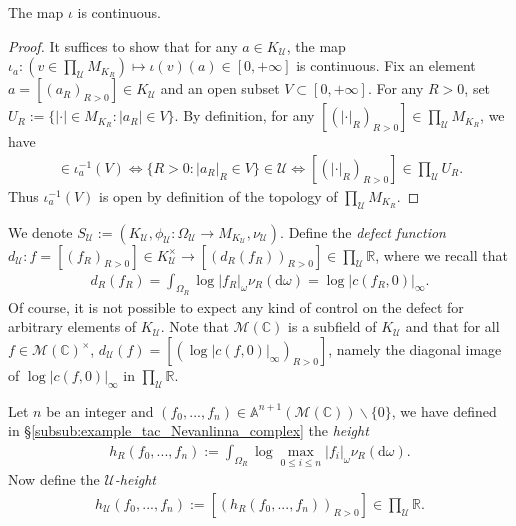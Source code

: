 \documentclass [11pt,reqno]{amsart}
\def\bC{{\mathbb{C}}}
\def\bR{{\mathbb{R}}}
\newcommand{\1}{\mathmybb{1}}
\def\cM{{\mathcal{M}}}
\def\cU{{\mathcal{U}}}
\def\diff{\mathrm{d}}
\def\setminus{\smallsetminus}
\begin{document}
\begin{claim}
\label{claim:ultraproduct_continuity}
The map $\iota$ is continuous.
\end{claim}

\begin{proof}
It suffices to show that for any $a\in K_{\cU}$, the map $\iota_{a}:(v\in\prod_{\cU}M_{K_{R}})\mapsto \iota(v)(a)\in [0,+\infty]$ is continuous. Fix an element $a=[(a_{R})_{R>0}]\in K_{\cU}$ and an open subset $V\subset[0,+\infty]$. For any $R>0$, set $U_{R}:=\{|\cdot|\in M_{K_{R}}: |a_{R}|\in V\}$. By definition, for any $[(|\cdot|_{R})_{R>0}]\in\prod_{\cU}M_{K_{R}}$, we have
\begin{align*}
[(|\cdot|_{R})_{R>0}] \in \iota_{a}^{-1}(V) \Leftrightarrow \{R>0 : |a_{R}|_{R} \in V\}\in \cU \Leftrightarrow [(|\cdot|_{R})_{R>0}] \in \prod_{\cU} U_{R}.
\end{align*}
Thus $\iota_{a}^{-1}(V)$ is open by definition of the topology of $\prod_{\cU}M_{K_{R}}$. 
\end{proof}

We denote $S_{\cU}:=(K_{\cU},\phi_{\cU} : \Omega_{\cU}\to M_{K_{\cU}},\nu_{\cU})$. Define the \emph{defect function} $d_{\cU} : f=[(f_{R})_{R>0}]\in K_{\cU}^{\times}\to [(d_{R}(f_{R}))_{R>0}]\in \prod_{\cU}\bR$, where we recall that
\begin{align*}
d_{R}(f_{R}) = \int_{\Omega_{R}}\log|f_{R}|_{\omega}\nu_{R}(\diff\omega) = \log|c(f_{R},0)|_{\infty}.
\end{align*}
Of course, it is not possible to expect any kind of control on the defect for arbitrary elements of $K_{\cU}$. Note that $\cM(\bC)$ is a subfield of $K_{\cU}$ and that for all $f\in \cM(\bC)^{\times}$, $d_{\cU}(f) = [(\log|c(f,0)|_{\infty})_{R>0}]$, namely the diagonal image of $\log|c(f,0)|_{\infty}$ in $\prod_{\cU}\bR$.

Let $n$ be an integer and $(f_{0},...,f_{n})\in \mathbb{A}^{n+1}(\cM(\bC))\setminus\{0\}$, we have defined in \S \ref{subsub:example_tac_Nevanlinna_complex} the \emph{height}
\begin{align*}
h_{R}(f_{0},...,f_{n}):= \int_{\Omega_{R}} \log\displaystyle\max_{0\leq i\leq n}|f_{i}|_{\omega} \nu_{R}(\diff\omega).
\end{align*} 
Now define the $\cU$\emph{-height} 
\begin{align*}
h_{\cU}(f_{0},...,f_{n}):= \left[\left(h_{R}(f_{0},...,f_{n})\right)_{R>0}\right] \in \displaystyle\prod_{\cU}\bR.
\end{align*}
\end{document}
